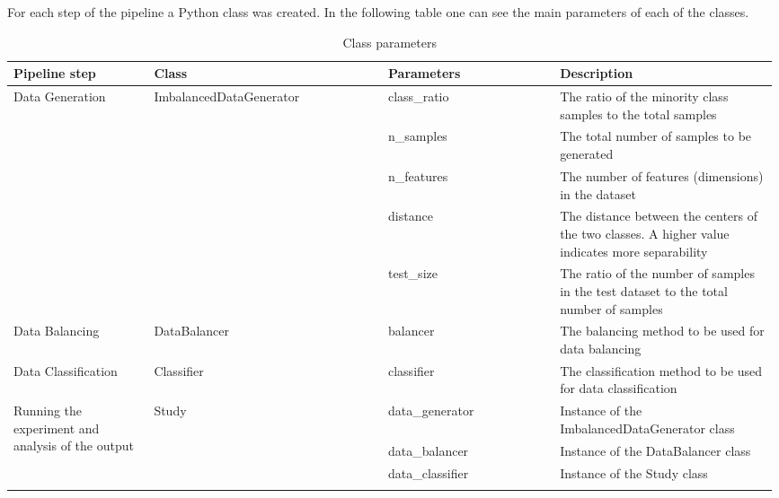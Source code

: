 For each step of the pipeline a Python class was created. In the
following table one can see the main parameters of each of the classes.
\begin{longtable}{|p{0.18\linewidth}|p{0.30\linewidth}|p{0.22\linewidth}|p{0.29\linewidth}|}
\hline
\begin{minipage}[b]{\linewidth}\raggedright
Pipeline step
\end{minipage} & \begin{minipage}[b]{\linewidth}\raggedright
Class
\end{minipage} & \begin{minipage}[b]{\linewidth}\raggedright
Parameters
\end{minipage} & \begin{minipage}[b]{\linewidth}\raggedright
Description
\end{minipage} \\
\hline
\endhead
\multirow{5}{*}{Data Generation} &
\multirow{5}{*}{ImbalancedDataGenerator} & class\_ratio & The ratio of the minority class samples to the total samples \\
\cline{3-4}
& & n\_samples & The total number of samples to be generated \\
\cline{3-4}
& & n\_features & The number of features (dimensions) in the dataset \\
\cline{3-4}
& & distance & The distance between the centers of the two classes. A higher value indicates more separability \\
\cline{3-4}
& & test\_size & The ratio of the number of samples in the test dataset to the total number of samples \\
\hline
Data Balancing & DataBalancer & balancer & The balancing method to be used for data balancing \\
\hline
Data Classification & Classifier & classifier & The classification method to be used for data classification \\
\hline
\multirow{3}{*}{Running the experiment and analysis of the output} &
\multirow{3}{*}{Study} & data\_generator & Instance of the ImbalancedDataGenerator class \\
\cline{3-4}
& & data\_balancer & Instance of the DataBalancer class \\
\cline{3-4}
& & data\_classifier & Instance of the Study class \\
\hline
\caption{Class parameters}
\end{longtable}


